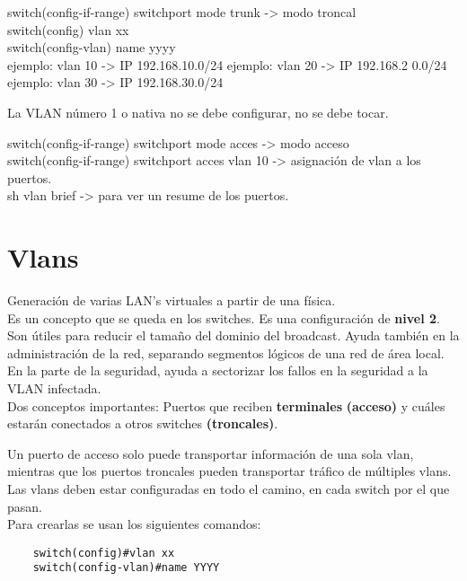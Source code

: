 switch(config-if-range) switchport mode trunk -> modo troncal \\

switch(config) vlan xx\\
switch(config-vlan) name yyyy \\


ejemplo: vlan 10 -> IP 192.168.10.0/24
ejemplo: vlan 20 -> IP 192.168.2    0.0/24
ejemplo: vlan 30 -> IP 192.168.30.0/24
 
La VLAN número 1 o nativa no se debe configurar, no se debe tocar.

switch(config-if-range) switchport mode acces -> modo acceso\\

switch(config-if-range) switchport acces vlan 10 -> asignación de vlan a los puertos.\\

sh vlan brief -> para ver un resume de los puertos.



\section{Vlans}

Generación de varias LAN's virtuales a partir de una física.\\

Es un concepto que se queda en los switches. Es una configuración de \textbf{nivel 2}. Son útiles para reducir el tamaño del dominio del broadcast. Ayuda también en la administración de la red, separando segmentos lógicos de una red de área local. En la parte de la seguridad, ayuda a sectorizar los fallos en la seguridad a la VLAN infectada.\\

Dos conceptos importantes: Puertos que reciben \textbf{terminales} \textbf{(acceso)} y cuáles estarán conectados a otros switches \textbf{(troncales)}.

Un puerto de acceso solo puede transportar información de una sola vlan, mientras que los puertos troncales pueden transportar tráfico de múltiples vlans. Las vlans deben estar configuradas en todo el camino, en cada switch por el que pasan.\\

Para crearlas se usan los siguientes comandos:\\

\begin{verbatim}
    switch(config)#vlan xx
    switch(config-vlan)#name YYYY
\end{verbatim}

